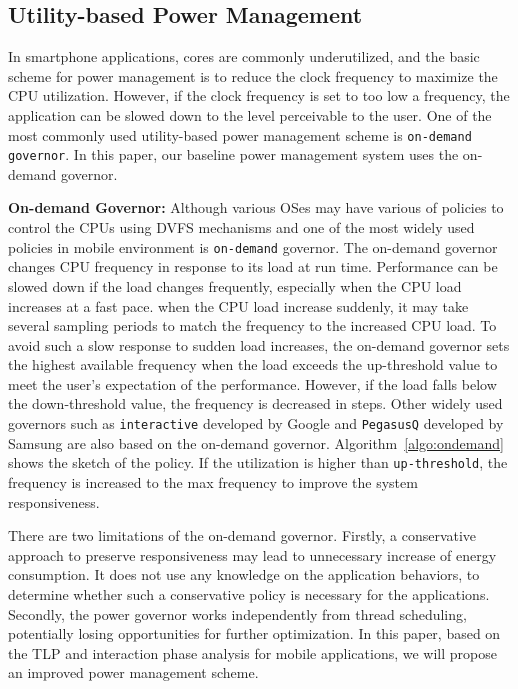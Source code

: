 \subsection{Utility-based Power Management}

In smartphone applications, cores are commonly underutilized, and the basic scheme for 
power management is to reduce the clock frequency to maximize the CPU utilization.
However, if the clock frequency is set to too low a frequency, the application can be slowed down
to the level perceivable to the user. One of the most commonly used utility-based
power management scheme is {\tt on-demand governor}. In this paper, our baseline
power management system uses the on-demand governor.

{\bf On-demand Governor: } 
Although various OSes may have various of policies to control the CPUs using DVFS mechanisms 
and one of the most widely used policies in mobile environment is {\tt on-demand} governor. 
The on-demand governor changes CPU frequency in response to its load at run time.
Performance can be slowed down if the load changes frequently, especially when the CPU load increases
at a fast pace. when the CPU load increase suddenly, it may take several sampling periods
to match the frequency to the increased CPU load.
To avoid such a slow response to sudden load increases, the on-demand governor sets the highest available frequency 
when the load exceeds the up-threshold value to meet the user's expectation of the performance.
However, if the load falls below the down-threshold value, the frequency is decreased in steps.
Other widely used governors such as {\tt interactive} developed by Google and {\tt PegasusQ} developed by Samsung
are also based on the on-demand governor.
Algorithm~\ref{algo:ondemand} shows the sketch of the policy. If the utilization is higher than {\tt up-threshold},
the frequency is increased to the max frequency to improve the system responsiveness.

There are two limitations of the on-demand governor. Firstly, a conservative approach to preserve responsiveness 
may lead to unnecessary increase of energy consumption. It does not use any knowledge on the application
behaviors, to determine whether such a conservative policy is necessary for the applications.
Secondly,
the power governor works independently from thread scheduling, potentially losing opportunities for
further optimization. In this paper, based on the TLP and interaction phase analysis for mobile applications,
we will propose an improved power management scheme. 



